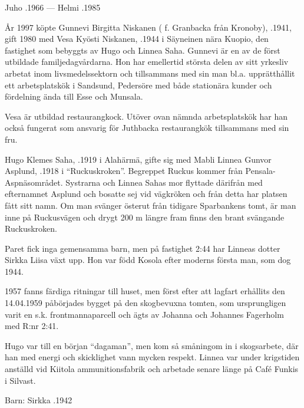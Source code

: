 Juho .1966  ---  Helmi .1985






År 1997 köpte Gunnevi Birgitta Niskanen ( f. Granbacka från Kronoby), .1941, gift 1980 med Vesa Kyösti Niskanen, .1944 i Säyneinen nära Kuopio, den fastighet som bebyggts av Hugo och Linnea Saha. Gunnevi är en av de först utbildade familjedagvårdarna. Hon har emellertid största delen av sitt yrkesliv arbetat inom livsmedelssektorn och tillsammans med sin man bl.a. upprätthållit ett arbetsplatskök i Sandsund, Pedersöre med både stationära kunder och fördelning ända till Esse och Munsala.

Vesa är utbildad restaurangkock. Utöver ovan nämnda arbetsplatskök har han också fungerat som ansvarig för Juthbacka restaurangkök tillsammans med sin fru.


Hugo Klemes Saha, .1919 i Alahärmä, gifte sig med Mabli Linnea Gunvor Asplund, .1918 i ``Ruckuskroken''. Begreppet Ruckus kommer från Pensala-Aspnäsområdet. Systrarna  och Linnea Sahas mor flyttade därifrån med efternamnet Asplund och bosatte sej vid vägkröken och från detta har platsen fått sitt namn. Om man svänger österut från tidigare Sparbankens tomt, är man inne på Ruckusvägen och drygt 200 m längre fram finns den brant svängande Ruckuskroken.

Paret fick inga gemensamma barn, men på fastighet 2:44 har Linneas dotter Sirkka Liisa växt upp. Hon var född Kosola efter moderns första man, som dog 1944.

1957 fanns färdiga ritningar till huset, men först efter att lagfart erhållits den 14.04.1959 påbörjades bygget på den skogbevuxna tomten, som ursprungligen varit en s.k. frontmannaparcell och ägts av Johanna och Johannes Fagerholm med R:nr 2:41.

Hugo var till en början ``dagaman'', men kom så småningom in i skogsarbete, där han med energi och skicklighet vann mycken respekt. Linnea var under krigstiden anställd vid Kiitola ammunitionsfabrik och arbetade senare länge på Café Funkis i Silvast.

Barn: Sirkka  .1942

